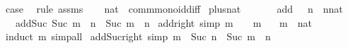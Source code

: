 \begin{isabellebody}
\ {\isacharquery}{\kern0pt}case\ \isamarkupfalse%
\ {\isacharparenleft}{\kern0pt}rule\ assms{\isacharparenleft}{\kern0pt}{}{\isacharparenright}{\kern0pt}{\isacharparenright}{\kern0pt}\isanewline
\ \ \isamarkupfalse%
\isanewline
{}\isamarkupfalse%
%
\endisatagproof
{\isafoldproof}%
%
\isadelimproof
%
\endisadelimproof
%
\isadelimdocument
%
\endisadelimdocument
%
\isatagdocument
%
\isamarkuptrue%
%
\endisatagdocument
{\isafolddocument}%
%
\isadelimdocument
%
\endisadelimdocument
{}\isamarkupfalse%
\ nat\ {\isacharcolon}{\kern0pt}{\isacharcolon}{\kern0pt}\ comm{\isacharunderscore}{\kern0pt}monoid{\isacharunderscore}{\kern0pt}diff\isanewline
{}\isanewline
\isanewline
{}\isamarkupfalse%
\ plus{\isacharunderscore}{\kern0pt}nat\isanewline
\ \ \isanewline
\ \ \ \ add{\isacharunderscore}{\kern0pt}{}{\isacharcolon}{\kern0pt}\ {\isachardoublequoteopen}{}\ {\isacharplus}{\kern0pt}\ n\ {\isacharequal}{\kern0pt}\ {\isacharparenleft}{\kern0pt}n{\isacharcolon}{\kern0pt}{\isacharcolon}{\kern0pt}nat{\isacharparenright}{\kern0pt}{\isachardoublequoteclose}\isanewline
\ \ {\isacharbar}{\kern0pt}\ add{\isacharunderscore}{\kern0pt}Suc{\isacharcolon}{\kern0pt}\ {\isachardoublequoteopen}Suc\ m\ {\isacharplus}{\kern0pt}\ n\ {\isacharequal}{\kern0pt}\ Suc\ {\isacharparenleft}{\kern0pt}m\ {\isacharplus}{\kern0pt}\ n{\isacharparenright}{\kern0pt}{\isachardoublequoteclose}\isanewline
\isanewline
{}\isamarkupfalse%
\ add{\isacharunderscore}{\kern0pt}{}{\isacharunderscore}{\kern0pt}right\ {\isacharbrackleft}{\kern0pt}simp{\isacharbrackright}{\kern0pt}{\isacharcolon}{\kern0pt}\ {\isachardoublequoteopen}m\ {\isacharplus}{\kern0pt}\ {}\ {\isacharequal}{\kern0pt}\ m{\isachardoublequoteclose}\isanewline
\ \ \ m\ {\isacharcolon}{\kern0pt}{\isacharcolon}{\kern0pt}\ nat\isanewline
%
\isadelimproof
\ \ %
\endisadelimproof
%
\isatagproof
{}\isamarkupfalse%
\ {\isacharparenleft}{\kern0pt}induct\ m{\isacharparenright}{\kern0pt}\ simp{\isacharunderscore}{\kern0pt}all%
\endisatagproof
{\isafoldproof}%
%
\isadelimproof
\isanewline
%
\endisadelimproof
\isanewline
{}\isamarkupfalse%
\ add{\isacharunderscore}{\kern0pt}Suc{\isacharunderscore}{\kern0pt}right\ {\isacharbrackleft}{\kern0pt}simp{\isacharbrackright}{\kern0pt}{\isacharcolon}{\kern0pt}\ {\isachardoublequoteopen}m\ {\isacharplus}{\kern0pt}\ Suc\ n\ {\isacharequal}{\kern0pt}\ Suc\ {\isacharparenleft}{\kern0pt}m\ {\isacharplus}{\kern0pt}\ n{\isacharparenright}{\kern0pt}{\isachardoublequoteclose}\isanewline

\end{isabellebody}
